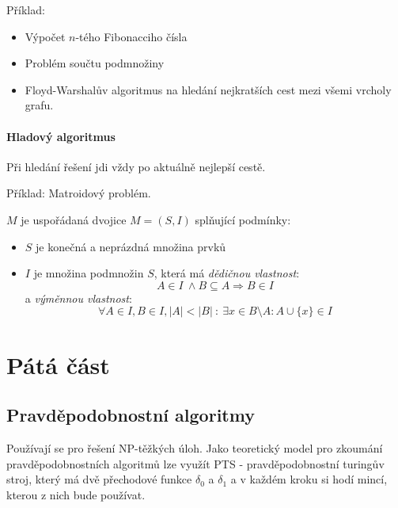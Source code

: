 \documentclass[a4paper]{article}      %
\newenvironment{definition}[1][Definice]{\begin{trivlist}
\item[\hskip \labelsep {\bfseries #1}]}{\end{trivlist}}
\begin{document}
Příklad:
\begin{itemize}
\item Výpočet $n$-tého Fibonacciho čísla
\item Problém součtu podmnožiny
\item Floyd-Warshalův algoritmus na hledání nejkratších cest mezi všemi vrcholy grafu.
\end{itemize}

\paragraph{Hladový algoritmus}
Při hledání řešení jdi vždy po aktuálně nejlepší cestě.

Příklad: Matroidový problém.

\begin{definition}[Matroid]
$M$ je uspořádaná dvojice $M=(S,I)$ splňující podmínky:
\begin{itemize}
\item $S$ je konečná a neprázdná množina prvků
\item $I$ je množina podmnožin $S$, která má \emph{dědičnou vlastnost}:
\[
A \in I\ \wedge B \subseteq A \Rightarrow B \in I
\]
a \emph{výměnnou vlastnost}:
\[
\forall A \in I, B \in I, |A|<|B|\ :\ \exists x \in B \setminus A: A \cup \lbrace x\rbrace \in I 
\]
\end{itemize}
\end{definition}

\section{Pátá část}

\subsection{Pravděpodobnostní algoritmy}

Používají se pro řešení NP-těžkých úloh. Jako teoretický model pro zkoumání pravděpodobnostních algoritmů lze
využít PTS - pravděpodobnostní turingův stroj, který má dvě přechodové funkce $\delta_0$ a $\delta_{1}$ a v každém kroku si hodí mincí, kterou z nich bude používat.
\end{document}

